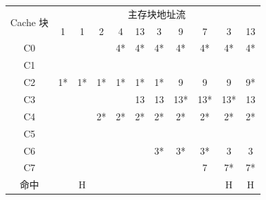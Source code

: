 \documentclass[cn, hazy, blue, normal, 12pt]{elegantnote}
\begin{document}
\begin{table}[h]
    \centering
    \begin{tabular}{ccccccccccc}
        \hline
        \multirow{2}{*}{Cache 块} & \multicolumn{10}{c}{主存块地址流}                                                 \\
        \cline{2-11}
                                 & 1                           & 1  & 2  & 4  & 13 & 3  & 9   & 7   & 3   & 13 \\
        \hline
        C0                       &                             &    &    & 4* & 4* & 4* & 4*  & 4*  & 4*  & 4* \\
        C1                       &                             &    &    &    &    &    &     &     &     &    \\
        C2                       & 1*                          & 1* & 1* & 1* & 1* & 1* & 9   & 9   & 9   & 9* \\
        C3                       &                             &    &    &    & 13 & 13 & 13* & 13* & 13* & 13 \\
        C4                       &                             &    & 2* & 2* & 2* & 2* & 2*  & 2*  & 2*  & 2* \\
        C5                       &                             &    &    &    &    &    &     &     &     &    \\
        C6                       &                             &    &    &    &    & 3* & 3*  & 3*  & 3   & 3  \\
        C7                       &                             &    &    &    &    &    &     & 7   & 7*  & 7* \\
        \hline
        命中                       &                             & H  &    &    &    &    &     &     & H   & H  \\
        \hline
    \end{tabular}
\end{table}
\end{document}
